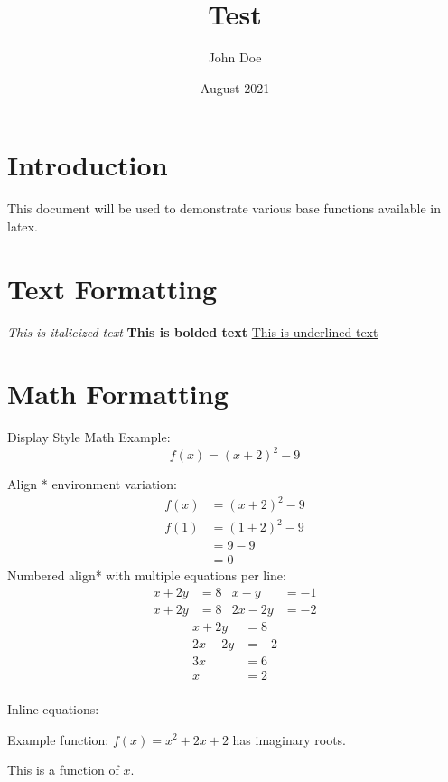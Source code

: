 \documentclass{article} %
\title{Test}
\author{John Doe}
\date{August 2021}
\begin{document}


\section{Introduction}
This document will be used to demonstrate various base functions available in latex. 

\section{Text Formatting}
\textit{This is italicized text}
\textbf{This is bolded text}
\underline{This is underlined text}

\section{Math Formatting}
Display Style Math Example:
\[f(x)=(x+2)^2-9\] %

Align * environment variation: %
\begin{align*}
f(x)&=(x+2)^2-9\\
f(1)&=(1+2)^2-9\\ 
&=9-9\\
&=0
\end{align*}
\indent Numbered align* with multiple equations per line:
\begin{align}
x+2y&=8 & x-y&=-1\\
x+2y&=8 & 2x-2y&=-2
\end{align}
\begin{align*}
x+2y&=8\\
2x-2y&=-2\\
3x&=6\\
x&=2\\
\end{align*}

Inline equations:

Example function: \(f(x)=x^2+2x+2\) has imaginary roots. %

This is a function of \(x\). %
\end{document}
